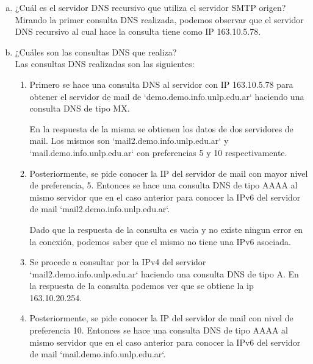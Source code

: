 \documentclass[osajnl,twocolumn,showpacs,superscriptaddress,10pt]{revtex4-1} %
\begin{document}
\begin{enumerate}[a)]
  \item ¿Cuál es el servidor DNS recursivo que utiliza el servidor SMTP origen? \\

  Mirando la primer consulta DNS realizada, podemos observar que el servidor DNS recursivo al cual hace la consulta tiene como IP 163.10.5.78. \\

  \item ¿Cuáles son las consultas DNS que realiza? \\

  Las consultas DNS realizadas son las siguientes:

  \begin{enumerate}[1.]
    \item Primero se hace una consulta DNS al servidor con IP 163.10.5.78 para obtener el servidor de mail de `demo.demo.info.unlp.edu.ar` haciendo una consulta DNS de tipo MX.

    En la respuesta de la misma se obtienen los datos de dos servidores de mail. Los mismos son `mail2.demo.info.unlp.edu.ar` y `mail.demo.info.unlp.edu.ar` con preferencias 5 y 10 respectivamente. \\

    \item Posteriormente, se pide conocer la IP del servidor de mail con mayor nivel de preferencia, 5. Entonces se hace una consulta DNS de tipo AAAA al mismo servidor que en el caso anterior para conocer la IPv6 del servidor de mail `mail2.demo.info.unlp.edu.ar`.

    Dado que la respuesta de la consulta es vacia y no existe ningun error en la conexión, podemos saber que el mismo no tiene una IPv6 asociada. \\

    \item Se procede a consultar por la IPv4 del servidor `mail2.demo.info.unlp.edu.ar` haciendo una consulta DNS de tipo A. En la respuesta de la consulta podemos ver que se obtiene la ip 163.10.20.254. \\

    \item Posteriormente, se pide conocer la IP del servidor de mail con nivel de preferencia 10. Entonces se hace una consulta DNS de tipo AAAA al mismo servidor que en el caso anterior para conocer la IPv6 del servidor de mail `mail.demo.info.unlp.edu.ar`.


\end{enumerate}
\end{enumerate}
\end{document}
